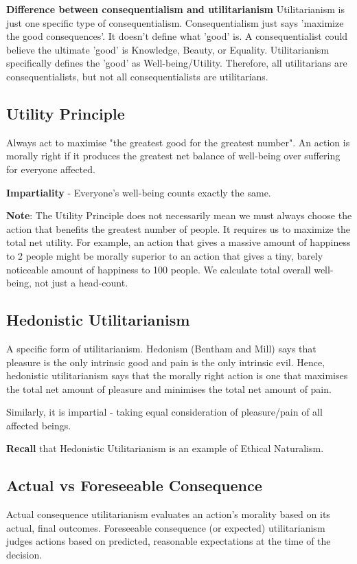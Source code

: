 \documentclass[12pt]{article}
\begin{document}
\vspace{1em}
\noindent\textbf{Difference between consequentialism and utilitarianism}
Utilitarianism is just one specific type of consequentialism.
Consequentialism just says 'maximize the good consequences'.
It doesn't define what 'good' is.
A consequentialist could believe the ultimate 'good' is Knowledge, Beauty, or Equality.
Utilitarianism specifically defines the 'good' as Well-being/Utility.
Therefore, all utilitarians are consequentialists, but not all consequentialists are utilitarians.

\subsection{Utility Principle}
Always act to maximise "the greatest good for the greatest number".
An action is morally right if it produces the greatest net balance of well-being over suffering for everyone affected.

\noindent \textbf{Impartiality} - Everyone's well-being counts exactly the same.

\vspace{1em}
\textbf{Note}: The Utility Principle does not necessarily mean we must always choose the action that benefits the greatest number of people.
It requires us to maximize the total net utility.
For example, an action that gives a massive amount of happiness to 2 people might be morally superior to an action that gives a tiny, barely noticeable amount of happiness to 100 people.
We calculate total overall well-being, not just a head-count.

\subsection{Hedonistic Utilitarianism}
A specific form of utilitarianism. Hedonism (Bentham and Mill) says that pleasure is the only intrinsic good and pain is the only intrinsic evil.
Hence, hedonistic utilitarianism says that the morally right action is one that maximises the total net amount of pleasure and minimises the total net amount of pain.

\noindent Similarly, it is impartial - taking equal consideration of pleasure/pain of all affected beings.

\noindent\textbf{Recall} that Hedonistic Utilitarianism is an example of Ethical Naturalism.

\subsection{Actual vs Foreseeable Consequence}
Actual consequence utilitarianism evaluates an action's morality based on its actual, final outcomes.
Foreseeable consequence (or expected) utilitarianism judges actions based on predicted, reasonable expectations at the time of the decision.
\end{document}
